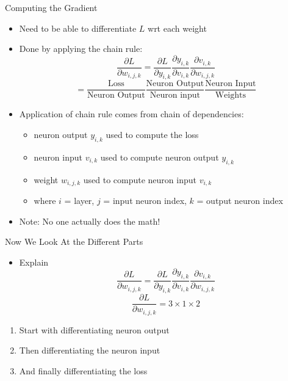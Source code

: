 \documentclass[aspectratio=169]{beamer}
\begin{document}
\begin{frame}{Computing the Gradient}

\begin{itemize}
	\item Need to be able to differentiate $L$ wrt each weight
	\item Done by applying the chain rule:
	$$ \frac{\partial L}{\partial w_{i,j,k}} = \frac{\partial L}{\partial y_{i,k}} 
						\frac{\partial y_{i,k}}{\partial v_{i,k}}
						\frac{\partial v_{i,k}}{\partial w_{i,j,k}}$$
	$$ = \frac{\text{Loss}}{\text{Neuron Output}}\frac{\text{Neuron Output}}{\text{Neuron input}}\frac{\text{Neuron Input}}{\text{Weights}}$$
	\item Application of chain rule comes from chain of dependencies: 
	\begin{itemize}
		\item neuron output $y_{i,k}$ used to compute the loss
		\item neuron input $v_{i,k}$ used to compute neuron output $y_{i,k}$
		\item weight $w_{i,j,k}$ used to compute neuron input $v_{i,k}$
		\item where $i$ = layer, $j$ = input neuron index, $k$ = output neuron index
	\end{itemize}
	\item Note: No one actually does the math!
\end{itemize}
\end{frame}
%
\begin{frame}{Now We Look At the Different Parts}

\begin{itemize} 
\item Explain
	$$ \frac{\partial L}{\partial w_{i,j,k}} = \frac{\partial L}{\partial y_{i,k}} 
						\frac{\partial y_{i,k}}{\partial v_{i,k}}
						\frac{\partial v_{i,k}}{\partial w_{i,j,k}}$$
	$$ \frac{\partial L}{\partial w_{i,j,k}} = 3 \times 1 \times 2$$ %
	\end{itemize}
\begin{enumerate} 
	\item Start with differentiating neuron output
	\item Then differentiating the neuron input
	\item And finally differentiating the loss
\end{enumerate}
\end{frame}
\end{document}
